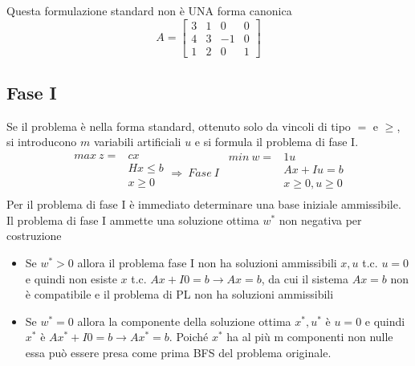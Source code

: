 \documentclass[12pt,a4paper]{article}
\begin{document}
\Sep \noindent
Questa formulazione standard non è UNA forma canonica
$$A=\left[\begin{array}{cccc}3&1&0&0\\4&3&-1&0\\1&2&0&1\end{array}\right]$$

\subsection{Fase I}
Se il problema è nella forma standard, ottenuto solo da vincoli di tipo $=$ e $\geq$, si introducono $m$ variabili artificiali $u$ e si formula il problema di fase I.
$$\begin{array}{rl}max \ z = & cx\\
& Hx \leq b\\
& x \geq 0\\
\end{array} \Rightarrow \ Fase\ I \ \ 
\begin{array}{rl}min \ w = & 1u\\
& Ax + Iu = b\\
& x \geq 0, u \geq 0\\
\end{array}$$
Per il problema di fase I è immediato determinare una base iniziale ammissibile.\\
Il problema di fase I ammette una soluzione ottima $w^*$ non negativa per costruzione
\begin{itemize}
\item Se $w^*>0$ allora il problema fase I non ha soluzioni ammissibili $x, u$ t.c. $u = 0$ e quindi non esiste $x$ t.c. $Ax + I0 = b \rightarrow Ax = b$, da cui il sistema $Ax = b$ non è compatibile e il problema di PL non ha soluzioni ammissibili
\item Se $w^*=0$ allora la componente della soluzione ottima $x^*, u^*$ è $u = 0$ e quindi $x^*$ è $Ax^*+I0 = b \rightarrow Ax^* =b$. Poiché $x^*$ ha al più m componenti non nulle essa può essere presa come prima BFS del problema originale.
\end{itemize}
\end{document}

